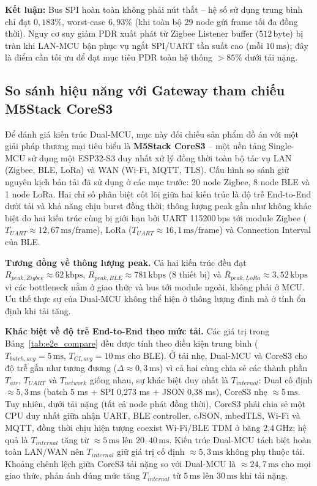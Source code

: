         \textbf{Kết luận:} Bus SPI hoàn toàn không phải nút thắt -- hệ số sử dụng trung bình chỉ đạt $0{,}183\%$, worst-case $6{,}93\%$ (khi toàn bộ 29 node gửi frame tối đa đồng thời). Nguy cơ suy giảm PDR xuất phát từ Zigbee Listener buffer ($512\,\text{byte}$) bị tràn khi LAN-MCU bận phục vụ ngắt SPI/UART tần suất cao (mỗi $10\,\text{ms}$); đây là điểm cần tối ưu để đạt mục tiêu PDR toàn hệ thống $> 85\%$ dưới tải nặng.
        
        \subsection{So sánh hiệu năng với Gateway tham chiếu M5Stack CoreS3}
        \label{subsec:perf_compare}
        
        Để đánh giá kiến trúc Dual-MCU, mục này đối chiếu sản phẩm đồ án với một giải pháp thương mại tiêu biểu là \textbf{M5Stack CoreS3} -- một nền tảng Single-MCU sử dụng một ESP32-S3 duy nhất xử lý đồng thời toàn bộ tác vụ LAN (Zigbee, BLE, LoRa) và WAN (Wi-Fi, MQTT, TLS). Cấu hình so sánh giữ nguyên kịch bản tải đã sử dụng ở các mục trước: 20 node Zigbee, 8 node BLE và 1 node LoRa. Hai chỉ số phân biệt cốt lõi giữa hai kiến trúc là độ trễ End-to-End dưới tải và khả năng chịu burst đồng thời; thông lượng peak gần như không khác biệt do hai kiến trúc cùng bị giới hạn bởi UART 115200\,bps tới module Zigbee ($T_{UART} \approx 12{,}67\,\text{ms/frame}$), LoRa ($T_{UART} \approx 16{,}1\,\text{ms/frame}$) và Connection Interval của BLE.
        
        \textbf{Tương đồng về thông lượng peak.} Cả hai kiến trúc đều đạt $R_{peak,Zigbee} \approx 62\,\text{kbps}$, $R_{peak,BLE} \approx 781\,\text{kbps}$ (8 thiết bị) và $R_{peak,LoRa} \approx 3{,}52\,\text{kbps}$ vì các bottleneck nằm ở giao thức và bus tới module ngoài, không phải ở MCU. Ưu thế thực sự của Dual-MCU không thể hiện ở thông lượng đỉnh mà ở tính ổn định khi tải tăng.
        
        \textbf{Khác biệt về độ trễ End-to-End theo mức tải.} Các giá trị trong Bảng~\ref{tab:e2e_compare} đều được tính theo điều kiện trung bình ($T_{batch,avg} = 5\,\text{ms}$, $T_{CI,avg} = 10\,\text{ms}$ cho BLE). Ở tải nhẹ, Dual-MCU và CoreS3 cho độ trễ gần như tương đương ($\Delta \approx 0{,}3\,\text{ms}$) vì cả hai cùng chia sẻ các thành phần $T_{air}$, $T_{UART}$ và $T_{network}$ giống nhau, sự khác biệt duy nhất là $T_{internal}$: Dual cố định $\approx 5{,}3\,\text{ms}$ (batch 5 ms + SPI 0,273 ms + JSON 0,38 ms), CoreS3 nhẹ $\approx 5\,\text{ms}$. Tuy nhiên, dưới tải nặng (tất cả node phát đồng thời), CoreS3 phải chia sẻ một CPU duy nhất giữa nhận UART, BLE controller, cJSON, mbedTLS, Wi-Fi và MQTT, đồng thời chịu hiện tượng coexist Wi-Fi/BLE TDM ở băng 2,4\,GHz; hệ quả là $T_{internal}$ tăng từ $\approx 5\,\text{ms}$ lên $20$--$40\,\text{ms}$. Kiến trúc Dual-MCU tách biệt hoàn toàn LAN/WAN nên $T_{internal}$ giữ giá trị cố định $\approx 5{,}3\,\text{ms}$ không phụ thuộc tải. Khoảng chênh lệch giữa CoreS3 tải nặng so với Dual-MCU là $\approx 24{,}7\,\text{ms}$ cho mọi giao thức, phản ánh đúng mức tăng $T_{internal}$ từ $5\,\text{ms}$ lên $30\,\text{ms}$ khi tải nặng.
        
